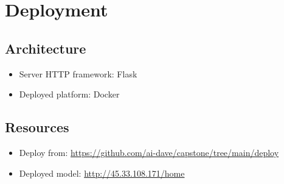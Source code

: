 \section{Deployment}

\subsection{Architecture}
\begin{itemize}
  \item Server HTTP framework: Flask
  \item Deployed platform: Docker
\end{itemize}


\subsection{Resources}

\begin{itemize}
  \item Deploy from: \url{https://github.com/ai-dave/capstone/tree/main/deploy} 
  \item Deployed model: \url{http://45.33.108.171/home}
\end{itemize}
